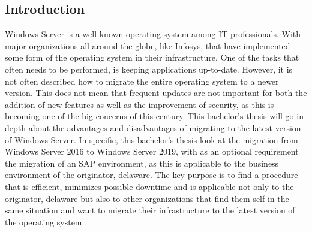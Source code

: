 \documentclass[a0,portrait]{a0poster}
\begin{document}
\begin{multicols}{2}
\section*{Introduction}
\color{black}
Windows Server is a well-known operating system among IT professionals. 
With major organizations all around the globe, like Infosys, that have implemented some form of the operating system in their infrastructure.
One of the tasks that often needs to be performed, is keeping applications up-to-date. 
However, it is not often described how to migrate the entire operating system to a newer version.  
This does not mean that frequent updates are not important for both the addition of new features as well as the improvement of security, as this is becoming one of the big concerns of this century. 
This bachelor's thesis will go in-depth about the advantages and disadvantages of migrating to the latest version of Windows Server.
In specific, this bachelor's thesis look at the migration from Windows Server 2016 to Windows Server 2019, with as an optional requirement the migration of an SAP environment, as this is applicable to the business environment of the originator, delaware.
The key purpose is to find a procedure that is efficient, minimizes possible downtime and is applicable not only to the originator, delaware but also to other organizations that find them self in the same situation and want to migrate their infrastructure to the latest version of the operating system.
\color{Black} %
\color{HoGentAccent1} 

\end{multicols}
\end{document}
